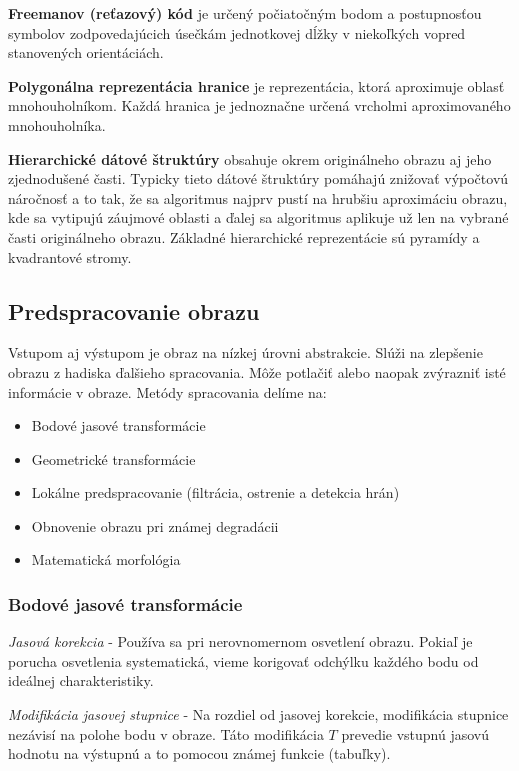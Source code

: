\begin{itemize}
\textbf{Freemanov (reťazový) kód}  je určený počiatočným bodom a postupnosťou symbolov zodpovedajúcich úsečkám jednotkovej dĺžky v niekoľkých vopred stanovených orientáciách. 

\textbf{Polygonálna reprezentácia hranice} je reprezentácia, ktorá aproximuje oblasť mnohouholníkom. Každá hranica je jednoznačne určená vrcholmi aproximovaného mnohouholníka.

\textbf{Hierarchické dátové štruktúry} obsahuje okrem originálneho obrazu aj jeho zjednodušené časti. Typicky tieto dátové štruktúry pomáhajú znižovať výpočtovú náročnosť a to tak, že sa algoritmus najprv pustí na hrubšiu aproximáciu obrazu, kde sa vytipujú záujmové oblasti a ďalej sa algoritmus aplikuje už len na vybrané časti originálneho obrazu. Základné hierarchické reprezentácie sú pyramídy a kvadrantové stromy. 

\end{itemize}



\subsection{Predspracovanie obrazu}
Vstupom aj výstupom je obraz na nízkej úrovni abstrakcie. Slúži na zlepšenie obrazu z hadiska ďalšieho spracovania. Môže potlačiť alebo naopak zvýrazniť isté informácie v obraze. Metódy spracovania delíme na: 
\begin{itemize}
\item Bodové jasové transformácie
\item Geometrické transformácie
\item Lokálne predspracovanie (filtrácia, ostrenie a detekcia hrán)
\item Obnovenie obrazu pri známej degradácii 
\item Matematická morfológia 
\end{itemize}

\subsubsection{Bodové jasové transformácie}

\textit{Jasová korekcia} - Používa sa pri nerovnomernom osvetlení obrazu. Pokiaľ je porucha
osvetlenia systematická, vieme korigovať odchýlku každého bodu od ideálnej charakteristiky.

\textit{Modifikácia jasovej stupnice} - Na rozdiel od jasovej korekcie, modifikácia stupnice nezávisí na polohe bodu v obraze. Táto modifikácia $T$ prevedie vstupnú jasovú hodnotu na výstupnú a to pomocou známej funkcie (tabuľky). 


